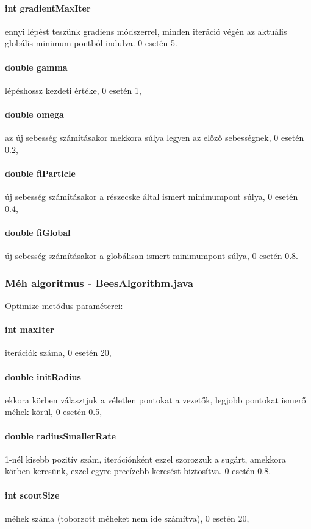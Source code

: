 \paragraph{int gradientMaxIter} ennyi lépést teszünk gradiens módszerrel, minden iteráció végén az aktuális globális minimum pontból indulva. 0 esetén 5.
\paragraph{double gamma} lépéshossz kezdeti értéke, 0 esetén 1,
\paragraph{double omega} az új sebesség számításakor mekkora súlya legyen az előző sebességnek, 0 esetén 0.2,
\paragraph{double fiParticle} új sebesség számításakor a részecske által ismert minimumpont súlya, 0 esetén 0.4,
\paragraph{double fiGlobal} új sebesség számításakor a globálisan ismert minimumpont súlya, 0 esetén 0.8.

\subsubsection{Méh algoritmus - BeesAlgorithm.java}
Optimize metódus paraméterei:
\paragraph{int maxIter} iterációk száma, 0 esetén 20,
\paragraph{double initRadius} ekkora körben választjuk a véletlen pontokat a vezetők, legjobb pontokat ismerő méhek körül, 0 esetén 0.5,
\paragraph{double radiusSmallerRate} 1-nél kisebb pozitív szám, iterációnként ezzel  szorozzuk a sugárt, amekkora körben keresünk, ezzel egyre precízebb keresést biztosítva. 0 esetén 0.8.
\paragraph{int scoutSize} méhek száma (toborzott méheket nem ide számítva), 0 esetén 20,

